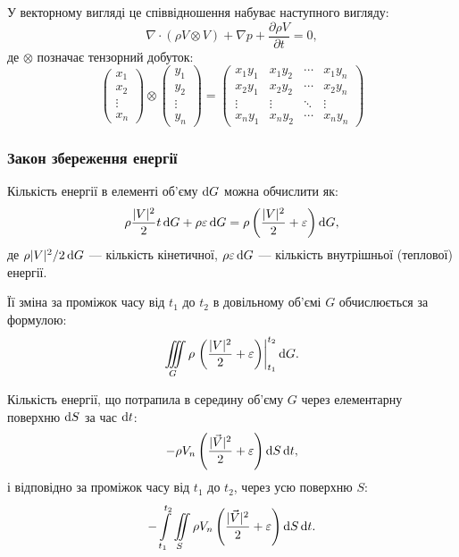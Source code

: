 У векторному вигляді це співвідношення набуває наступного вигляду:
\begin{equation}
	\nabla \cdot (\rho V \otimes V) + \nabla p + \frac{\partial \rho V}{\partial t} = 0,
\end{equation}
де $\otimes$ позначає тензорний добуток:
\begin{equation}
	\begin{pmatrix}
		x_1 \\
		x_2 \\
		\vdots \\
		x_n
	\end{pmatrix} 
	\otimes
	\begin{pmatrix}
		y_1 \\
		y_2 \\
		\vdots \\
		y_n
	\end{pmatrix} 
	=
	\begin{pmatrix}
		x_1 y_1 & x_1 y_2 & \cdots & x_1 y_n \\
		x_2 y_1 & x_2 y_2 & \cdots & x_2 y_n \\
		\vdots & \vdots & \ddots & \vdots \\
		x_n y_1 & x_n y_2 & \cdots & x_n y_n
	\end{pmatrix}
\end{equation}

\subsubsection{Закон збереження енергії}

Кількість енергії в елементі об'єму $\mathop{}\!\mathrm{d} G$ можна обчислити як:
\begin{equation}
	\rho  \frac{|V|^2}{2} t \mathop{}\!\mathrm{d} G + \rho  \varepsilon  \mathop{}\!\mathrm{d} G = \rho \left( \frac{|V|^2}{2} + \varepsilon \right) \mathop{}\!\mathrm{d} G,
\end{equation}
де $\rho  |V|^2 / 2  \mathop{}\!\mathrm{d} G$ --- кількість кінетичної, $\rho  \varepsilon  \mathop{}\!\mathrm{d} G$ --- кількість внутрішньої (теплової) енергії. \medskip

Її зміна за проміжок часу від $t_1$ до $t_2$ в довільному об'ємі $G$ обчислюється за формулою:
\begin{equation}
	\displaystyle\iiint\limits_G \rho \left. \left( \frac{|V|^2}{2} + \varepsilon \right) \right|_{t_1}^{t_2} \mathop{}\!\mathrm{d} G.
\end{equation}

Кількість енергії, що потрапила в середину об'єму $G$ через елементарну поверхню $\mathop{}\!\mathrm{d} S$ за час $\mathop{}\!\mathrm{d} t$:
\begin{equation}
	- \rho V_n \left( \frac{|\vec V|^2}{2} + \varepsilon \right) \mathop{}\!\mathrm{d} S \mathop{}\!\mathrm{d} t,
\end{equation}
і відповідно за проміжок часу від $t_1$ до $t_2$, через усю поверхню $S$:
\begin{equation}
	- \displaystyle\int\limits_{t_1}^{t_2} \displaystyle\iint\limits_S \rho V_n \left( \frac{|\vec V|^2}{2} + \varepsilon \right) \mathop{}\!\mathrm{d} S \mathop{}\!\mathrm{d} t.
\end{equation}

